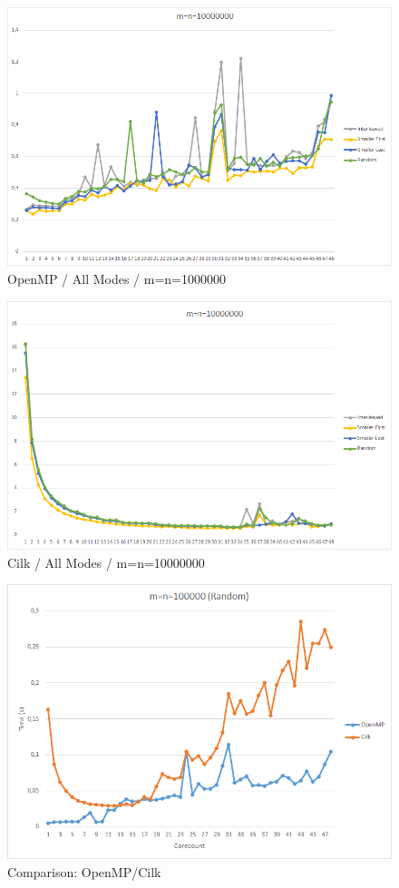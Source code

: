 \documentclass[12pt,a4paper,titlepage,oneside]{scrartcl}
\begin{document}
\begin{figure}[h]
\includegraphics[width=\linewidth]{Saturn_OpenMP_10000000}
\caption{OpenMP / All Modes / m=n=1000000}
\end{figure}

\begin{figure}[h]
\includegraphics[width=\linewidth]{Saturn_Cilk_10000000}
\caption{Cilk / All Modes / m=n=10000000}
\end{figure}

\begin{figure}[h]
\includegraphics[width=\linewidth]{Saturn_Random_100000}
\caption{Comparison: OpenMP/Cilk}
\end{figure}
\end{document}
